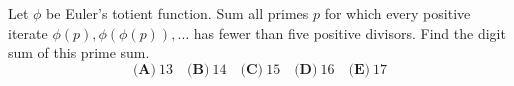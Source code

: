 Let $\phi$ be Euler's totient function. Sum all primes $p$ for which every positive iterate $\phi(p),\phi(\phi(p)),\ldots$ has fewer than five positive divisors. Find the digit sum of this prime sum.
\[\textbf{(A)}~13\quad\textbf{(B)}~14\quad\textbf{(C)}~15\quad\textbf{(D)}~16\quad\textbf{(E)}~17\]

